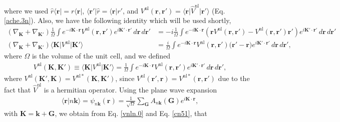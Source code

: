 where we used $\hat{r}\langle\mathbf{r}\vert = r\langle\mathbf{r}\vert$,
$\langle\mathbf{r}'\vert\hat{r} = \langle\mathbf{r}\vert r'$, and
$V^\mathrm{nl}(\mathbf{r},\mathbf{r}') =
\langle\mathbf{r}\vert\hat{V}^\mathrm{nl}\vert\mathbf{r}'\rangle$
(Eq. \eqref{ache.3n}). Also, we have the following identity which will be used
shortly,
\begin{align}\label{cn51}
(\nabla_\mathbf{K}+\nabla_{\mathbf{K}'})\frac{1}{\Omega}\int e^{-i\mathbf{K}\cdot\mathbf{r}}V^\mathrm{nl}(\mathbf{r},\mathbf{r}')e^{i\mathbf{K}'\cdot\mathbf{r}'}\,d\mathbf{r}\,d\mathbf{r}'
&= -i \frac{1}{\Omega} \int e^{-i\mathbf{K}\cdot\mathbf{r}} \left(\mathbf{r} V^\mathrm{nl}(\mathbf{r},\mathbf{r}') - V^\mathrm{nl}(\mathbf{r},\mathbf{r}') \mathbf{r}'\right) e^{i\mathbf{K}'\cdot\mathbf{r}'} \,d\mathbf{r}\,d\mathbf{r}'\nonumber\\ (\nabla_\mathbf{K}+\nabla_{\mathbf{K}'}) \langle\mathbf{K}\vert V^\mathrm{nl} \vert\mathbf{K}'\rangle
&= \frac{i}{\Omega} \int e^{-i\mathbf{K}\cdot\mathbf{r}} V^\mathrm{nl}(\mathbf{r},\mathbf{r}') \big(\mathbf{r}'- \mathbf{r} \big) e^{i\mathbf{K}'\cdot\mathbf{r}'} \,d\mathbf{r}\,d\mathbf{r}',
\end{align}
where $\Omega$ is the volume of the unit cell, and we defined
\begin{align}\label{cn52}
V^\mathrm{nl}(\mathbf{K},\mathbf{K}') 
\equiv
\langle\mathbf{K}\vert V^\mathrm{nl} \vert\mathbf{K}'\rangle
= \frac{1}{\Omega} \int e^{-i\mathbf{K}\cdot\mathbf{r}} V^\mathrm{nl}(\mathbf{r},\mathbf{r}') e^{i\mathbf{K}'\cdot\mathbf{r}'} \,d\mathbf{r}\,d\mathbf{r}',
\end{align}
where 
$V^\mathrm{nl}(\mathbf{K}',\mathbf{K}) =V^{\mathrm{nl} *}(\mathbf{K},\mathbf{K}')$, since $V^\mathrm{nl}(\mathbf{r}',\mathbf{r})=V^{\mathrm{nl}*}(\mathbf{r},\mathbf{r}')$ due to the fact that $\hat V^\mathrm{nl}$ is a hermitian operator. Using the plane wave expansion
\begin{align}\label{cn3}
\langle\mathbf{r}\vert n\mathbf{k}\rangle=\psi_{n\mathbf{k}}(\mathbf{r})=\frac{1}{\sqrt{\Omega}} \sum_{\mathbf{G}} A_{n\mathbf{k}}(\mathbf{G})e^{i\mathbf{K}\cdot\mathbf{r}} ,
\end{align}
with $\mathbf{K}=\mathbf{k}+\mathbf{G}$, we obtain from Eq. \eqref{vnln.0} and Eq. \eqref{cn51}, that
